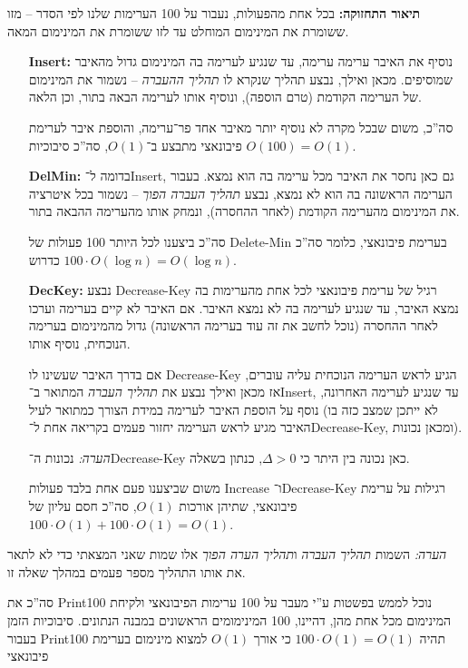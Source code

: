 \documentclass[]{article}
\newcommand\logn  {\log n}
\newcommand\Dg        {\Delta}
\theoremstyle{definition}
\begin{document}
    \textbf{תיאור התחזוקה: }בכל אחת מהפעולות, נעבור על 100 הערימות שלנו לפי הסדר – מזו ששומרת את המינימום המוחלט עד לזו ששומרת את המינימום המאה. 
    \begin{itemize}
        \item[\textbf{Insert:}]נוסיף את האיבר ערימה ערימה, עד שנגיע לערימה בה המינימום גדול מהאיבר שמוסיפים. מכאן ואילך, נבצע תהליך שנקרא לו \textit{תהליך ההעברה} – נשמור את המינימום של הערימה הקודמת (טרם הוספה), ונוסיף אותו לערימה הבאה בתור, וכן הלאה. 
        
        סה''כ, משום שבכל מקרה לא נוסיף יותר מאיבר אחד פר־ערימה, והוספת איבר לערימת פיבונאצי מתבצע ב־$O(1)$, סה''כ סיבוכיות $O(100) = O(1)$. 
        \item[\textbf{DelMin:}]בדומה ל־Insert, גם כאן נחסר את האיבר מכל ערימה בה הוא נמצא. בעבור הערימה הראשונה בה הוא לא נמצא, נבצע \textit{תהליך העברה הפוך} – נשמור בכל איטרציה את המינימום מהערימה הקודמת (לאחר ההחסרה), ונמחק אותו מהערימה ההבאה בתור. 
        
        סה''כ ביצענו לכל היותר 100 פעולות של Delete-Min בערימת פיבונאצי, כלומר סה''כ $100 \cdot O(\logn) = O(\logn)$ כדרוש. 
        
        \item[\textbf{DecKey:}]נבצע Decrease-Key רגיל של ערימת פיבונאצי לכל אחת מהערימות בה נמצא האיבר, עד שנגיע לערימה בה לא נמצא האיבר. אם האיבר לא קיים בערימה וערכו לאחר ההחסרה (נוכל לחשב את זה עוד בערימה הראשונה) גדול מהמינימום בערימה הנוכחית, נוסיף אותו. 
        
        אם בדרך האיבר שעשינו לו Decrease-Key הגיע לראש הערימה הנוכחית עליה עוברים, אז מכאן ואילך נבצע את \textit{תהליך העברה} המתואר ב־Insert, עד שנגיע לערימה האחרונה, נוסף על הוספת האיבר לערימה במידת הצורך כמתואר לעיל (לא ייתכן שמצב כזה בו האיבר מגיע לראש הערימה יחזור פעמים בקריאה אחת ל־Decrease-Key, ומכאן נכונות). 
        
        \textit{הערה: }נכונות ה־Decrease-Key כאן נכונה בין היתר כי $\Dg > 0$, כנתון בשאלה. 
        
        משום שביצענו פעם אחת בלבד פעולות Increase ו־Decrease-Key רגילות על ערימת פיבונאצי, שתיהן אורכות $O(1)$, סה''כ חסם עליון של $100 \cdot O(1) + 100 \cdot O(1) = O(1)$. 
    \end{itemize}
    
    \textit{הערה: }השמות \textit{תהליך העברה} ו\textit{תהליך הערה הפוך} אלו שמות שאני המצאתי כדי לא לתאר את אותו התהליך מספר פעמים במהלך שאלה זו. 
    
    סה''כ את Print100 נוכל לממש בפשטות ע''י מעבר על 100 ערימות הפיבונאצי ולקיחת המינימום מכל אחת מהן, דהיינו, 100 המינימומים הראשונים במבנה הנתונים. סיבוכיות הזמן בעבור Print100 תהיה $100 \cdot O(1) = O(1)$ כי אורך $O(1)$ למצוא מינימום בערימת פיבונאצי
    
\end{document}
